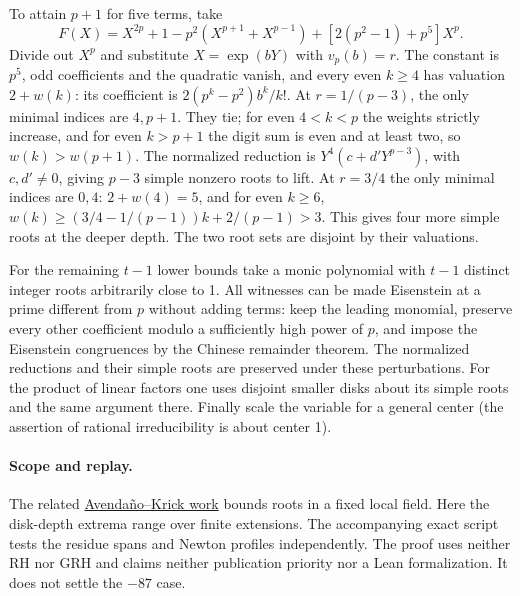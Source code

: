 \documentclass[11pt]{article}
\begin{document}
To attain \(p+1\) for five terms, take
\[
 F(X)=X^{2p}+1-p^2(X^{p+1}+X^{p-1})+
                [2(p^2-1)+p^5]X^p.
\]
Divide out \(X^p\) and substitute \(X=\exp(bY)\) with \(v_p(b)=r\).
The constant is \(p^5\), odd coefficients and the quadratic vanish,
and every even \(k\ge4\) has valuation \(2+w(k)\):
its coefficient is \(2(p^k-p^2)b^k/k!\).
At \(r=1/(p-3)\), the only minimal indices are \(4,p+1\).
They tie; for even \(4<k<p\) the weights strictly increase,
and for even \(k>p+1\) the digit sum is even and at least two,
so \(w(k)>w(p+1)\). The normalized reduction is
\(Y^4(c+d'Y^{p-3})\), with \(c,d'\ne0\), giving \(p-3\)
simple nonzero roots to lift. At \(r=3/4\) the only minimal indices
are \(0,4\): \(2+w(4)=5\), and for even \(k\ge6\),
\(w(k)\ge(3/4-1/(p-1))k+2/(p-1)>3\).
This gives four more simple roots at the deeper depth.
The two root sets are disjoint by their valuations.

For the remaining \(t-1\) lower bounds take a monic polynomial
with \(t-1\) distinct integer roots arbitrarily close to 1.
All witnesses can be made Eisenstein at a prime different from \(p\)
without adding terms: keep the leading monomial, preserve every
other coefficient modulo a sufficiently high power of \(p\), and
impose the Eisenstein congruences by the Chinese remainder theorem.
The normalized reductions and their simple roots are preserved
under these perturbations. For the product of linear factors one
uses disjoint smaller disks about its simple roots and the same
argument there. Finally scale the variable for a general center
(the assertion of rational irreducibility is about center 1).

\paragraph{Scope and replay.}
The related \href{https://arxiv.org/abs/1008.4808}{Avenda\~no--Krick work}
bounds roots in a fixed local field. Here the disk-depth extrema
range over finite extensions. The accompanying exact script tests
the residue spans and Newton profiles independently. The proof
uses neither RH nor GRH and claims neither publication priority
nor a Lean formalization. It does not settle the \(-87\) case.
\end{document}
